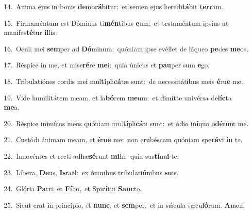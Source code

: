 {\numbfont\textcolor{\numbcolor}{14.}}~Anima ejus in bonis \textbf{de}\-mo\-\textbf{rá}\-bitur:~\star et semen ejus heredi\-\textbf{tá}\-bit \textbf{ter}\-ram.\par
{\numbfont\textcolor{\numbcolor}{15.}}~Firmaméntum est Dóminus ti\-\textbf{mén}\-tibus \textbf{e}\-um:~\star et testaméntum ipsíus ut manifes\-\textbf{té}\-tur \textbf{il}\-lis.\par
{\numbfont\textcolor{\numbcolor}{16.}}~Oculi mei \textbf{sem}\-per ad \textbf{Dó}\-minum:~\star quóniam ipse evéllet de láqueo \textbf{pe}\-des \textbf{me}\-os.\par
{\numbfont\textcolor{\numbcolor}{17.}}~Réspice in me, et mise\-\textbf{ré}\-re \textbf{me}\-i:~\star quia únicus et \textbf{pau}\-per sum \textbf{e}\-go.\par
{\numbfont\textcolor{\numbcolor}{18.}}~Tribulatiónes cordis mei mul\-\textbf{ti}\-pli\-\textbf{cá}\-tæ sunt:~\star de necessitátibus meis \textbf{é}\-ru\textbf{e} me.\par
{\numbfont\textcolor{\numbcolor}{19.}}~Vide humilitátem meam, et la\-\textbf{bó}\-rem \textbf{me}\-um:~\star et dimítte univérsa de\-\textbf{líc}\-ta \textbf{me}\-a.\par
{\numbfont\textcolor{\numbcolor}{20.}}~Réspice inimícos meos quóniam mul\-\textbf{ti}\-pli\-\textbf{cá}\-ti sunt:~\star et ódio in\-\textbf{í}\-quo o\-\textbf{dé}\-runt me.\par
{\numbfont\textcolor{\numbcolor}{21.}}~Custódi ánimam meam, et \textbf{é}\-ru\textbf{e} me:~\star non erubéscam quóniam spe\-\textbf{rá}\-vi \textbf{in} te.\par
{\numbfont\textcolor{\numbcolor}{22.}}~Innocéntes et recti adhæ\-\textbf{sé}\-runt \textbf{mi}\-hi:~\star quia sus\-\textbf{tí}\-nu\textbf{i} te.\par
{\numbfont\textcolor{\numbcolor}{23.}}~Líbera, \textbf{De}\-us, \textbf{Is}\-raël:~\star ex ómnibus tribulati\-\textbf{ó}\-nibus \textbf{su}\-is.\par
{\numbfont\textcolor{\numbcolor}{24.}}~Glória \textbf{Pa}\-tri, et \textbf{Fí}\-lio,~\star et Spi\-\textbf{rí}\-tui \textbf{Sanc}\-to.\par
{\numbfont\textcolor{\numbcolor}{25.}}~Sicut erat in princípio, et \textbf{nunc}\-, et \textbf{sem}\-per,~\star et in sǽcula sæcu\-\textbf{ló}\-rum. \textbf{A}\-men.\par
